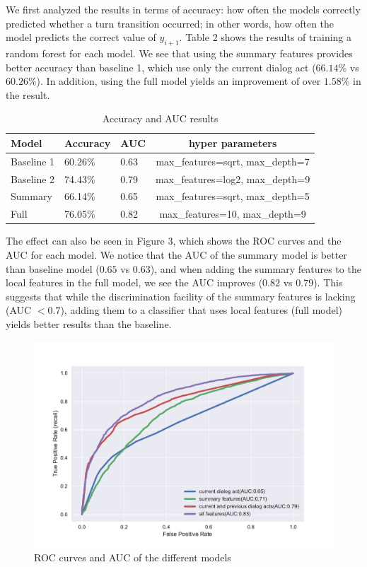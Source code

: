 We first analyzed the results in terms of accuracy: how often the models correctly predicted whether a turn transition occurred; in other words, how often the model predicts the correct value of $y_{i+1}$.
%
Table 2 shows the results of training a random forest for each model.
We see that using the summary features provides better accuracy than baseline 1, which use only the current dialog act ($66.14\%$ vs $60.26\%$). In addition, using the full model yields an improvement of over $1.58\%$ in the result.
%
\begin{table}[ht!]
\scriptsize
   \begin{center}
    \begin{tabular}{| l | l | l | c |}
    \hline
    Model & Accuracy & AUC & hyper parameters\\
    \hline
    Baseline 1      & 60.26\% & 0.63 & \scriptsize{max\_features=sqrt, max\_depth=7} \\
    Baseline 2     & 74.43\% & 0.79 & \scriptsize{max\_features=log2, max\_depth=9}\\
    Summary        & 66.14\% & 0.65 & \scriptsize{max\_features=sqrt, max\_depth=5} \\
    Full           & 76.05\% & 0.82 &\scriptsize{max\_features=10, max\_depth=9}\\
  \hline
\end{tabular}
\end{center}
\vspace{-1.2em}
\caption{Accuracy and AUC results }
\end{table}

The effect can also be seen in Figure 3, which shows the ROC curves and the AUC for each
model. We notice that the AUC of the summary model is better than baseline model ($0.65$ vs $0.63$), and when adding the summary features to the local features in the full model, we see the AUC improves ($0.82$ vs $0.79$). This suggests that while the discrimination facility of the summary features is lacking (AUC $<0.7$), adding them to a classifier that uses local features (full model) yields better results than the baseline.
%
 \begin{figure}[ht!]
 \centering
 \includegraphics[width=\textwidth]{../scikitlearn/figures/roc.pdf}\vspace{-1.5em}
 \caption{ROC curves and AUC of the different models \label{overflow}}
 \end{figure}

